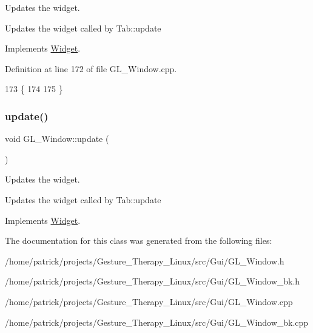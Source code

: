 Updates the widget. 

Updates the widget called by Tab\+::update 

Implements \hyperlink{class_widget_a726dc97add2c6eb82967144207280ace}{Widget}.



Definition at line 172 of file G\+L\+\_\+\+Window.\+cpp.


\begin{DoxyCode}
173 \{
174 
175 \}
\end{DoxyCode}
\mbox{\label{class_g_l___window_a34eab971f586b7d383d05475195bc462}} 
\subsubsection{\texorpdfstring{update()}{update()}\hspace{0.1cm}{\footnotesize\ttfamily [2/2]}}
{\footnotesize\ttfamily void G\+L\+\_\+\+Window\+::update (\begin{DoxyParamCaption}{ }\end{DoxyParamCaption})\hspace{0.3cm}{\ttfamily [virtual]}}



Updates the widget. 

Updates the widget called by Tab\+::update 

Implements \hyperlink{class_widget_a726dc97add2c6eb82967144207280ace}{Widget}.



The documentation for this class was generated from the following files\+:\begin{DoxyCompactItemize}
\item 
/home/patrick/projects/\+Gesture\+\_\+\+Therapy\+\_\+\+Linux/src/\+Gui/G\+L\+\_\+\+Window.\+h\item 
/home/patrick/projects/\+Gesture\+\_\+\+Therapy\+\_\+\+Linux/src/\+Gui/G\+L\+\_\+\+Window\+\_\+bk.\+h\item 
/home/patrick/projects/\+Gesture\+\_\+\+Therapy\+\_\+\+Linux/src/\+Gui/G\+L\+\_\+\+Window.\+cpp\item 
/home/patrick/projects/\+Gesture\+\_\+\+Therapy\+\_\+\+Linux/src/\+Gui/G\+L\+\_\+\+Window\+\_\+bk.\+cpp\end{DoxyCompactItemize}
